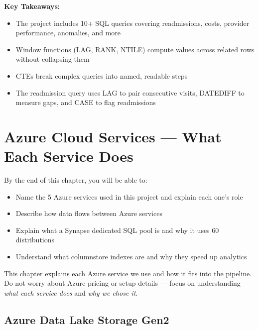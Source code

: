 \documentclass[12pt, a4paper, oneside]{report}
\begin{document}
\begin{summarybox}
\textbf{Key Takeaways:}
\begin{itemize}
    \item The project includes 10+ SQL queries covering readmissions, costs, provider performance, anomalies, and more
    \item Window functions (LAG, RANK, NTILE) compute values across related rows without collapsing them
    \item CTEs break complex queries into named, readable steps
    \item The readmission query uses LAG to pair consecutive visits, DATEDIFF to measure gaps, and CASE to flag readmissions
\end{itemize}
\end{summarybox}


\chapter{Azure Cloud Services --- What Each Service Does}
\label{ch:azure}

\begin{objectivebox}
By the end of this chapter, you will be able to:
\begin{itemize}
    \item Name the 5 Azure services used in this project and explain each one's role
    \item Describe how data flows between Azure services
    \item Explain what a Synapse dedicated SQL pool is and why it uses 60 distributions
    \item Understand what columnstore indexes are and why they speed up analytics
\end{itemize}
\end{objectivebox}

This chapter explains each Azure service we use and how it fits into the pipeline. Do not worry about Azure pricing or setup details --- focus on understanding \textit{what each service does} and \textit{why we chose it}.

\section{Azure Data Lake Storage Gen2}
\end{document}
